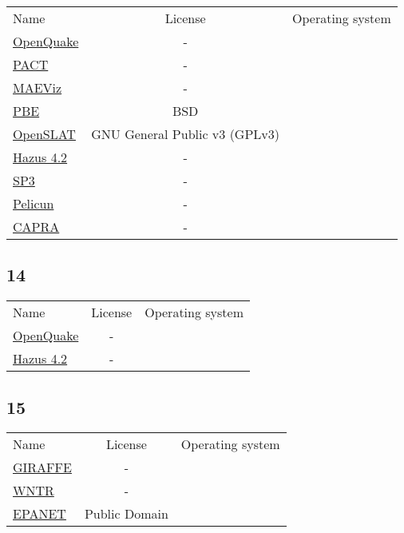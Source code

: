 \begin{table}[]
    \centering
    \begin{tabular}{l|cc}
    \toprule
    Name &  License & Operating system\\ 
        \href{https://www.globalquakemodel.org/openquake}{OpenQuake} & - &\\
        \href{https://femap58.atcouncil.org/pact}{PACT} & - &\\
        \href{http://mae.cee.illinois.edu/software/software_maeviz.html}{MAEViz} & - &\\
        \href{https://simcenter.designsafe-ci.org/research-tools/pbe-application/}{PBE} &  BSD  &\\
        \href{https://github.com/openslat/SLAT}{OpenSLAT} &  GNU General Public  v3 (GPLv3) &\\
        \href{}{Hazus 4.2} & - &\\
        \href{https://www.hbrisk.com/}{SP3} & - &\\
        \href{https://nheri-simcenter.github.io/pelicun/}{Pelicun} & - &\\
        \href{https://ecapra.org/}{CAPRA} & - &\\ 
    \bottomrule
    \end{tabular}
\end{table}

\subsection{14}

\begin{table}[]
    \centering
    \begin{tabular}{l|cc}
    \toprule
    Name &  License & Operating system\\ 
        \href{https://www.globalquakemodel.org/openquake}{OpenQuake} & - &\\
        \href{}{Hazus 4.2} & - &\\ 
    \bottomrule
    \end{tabular}
\end{table}

\subsection{15}

\begin{table}[]
    \centering
    \begin{tabular}{l|cc}
    \toprule
    Name &  License & Operating system\\ 
        \href{}{GIRAFFE} & - &\\
        \href{}{WNTR} & - &\\
        \href{https://www.epa.gov/water-research/epanet}{EPANET} &  Public Domain &\\ 
    \bottomrule
    \end{tabular}
\end{table}
